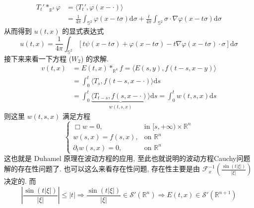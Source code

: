 \documentclass[11pt]{ctexart}[UTF8]
\begin{document}
\begin{equation*}
    \begin{aligned}
        T_{t}' \ast_{\mathbb{R}^{3}} \varphi &= \langle T_{t}', \varphi(x - \cdot) \rangle \\
                                         &= \frac{1}{4\pi}\int_{\mathbb{S}^{2}}  \varphi(x - t\sigma) \mathrm{d}\sigma + \frac{t}{4\pi}\int_{\mathbb{S}^{2}}  \sigma \cdot \nabla\varphi(x - t\sigma) \mathrm{d}\sigma
    \end{aligned}
\end{equation*}
从而得到 $u(t,x)$ 的显式表达式
\begin{equation}\label{Explict Kirchhoff formula}
    u(t,x) = \frac{1}{4\pi}\int_{\mathbb{S}^{2}} \left[ t\psi(x-t\sigma)+\varphi(x-t\sigma)-t \nabla\varphi(x-t\sigma)\cdot \sigma \right]\mathrm{d}\sigma
\end{equation}
接下来来看一下方程 ($W_{2}$) 的求解. 
\begin{equation*}
    \begin{aligned}
        v(t,x) &= E(t,x) \ast_{\mathbb{R}^{4}} f = \langle E(s,y), f(t-s,x-y) \rangle \\
               &= \int_{0}^{t} \langle T_{s}, f(t-s,x-\cdot) \rangle \mathrm{d}s\\
               &= \int_{0}^{t} \underbrace{\langle T_{t-s}, f(s,x-\cdot) \rangle}_{w(t,s,x)} \mathrm{d}s = \int_{0}^{t} w(t,s,x) \mathrm{d}s
    \end{aligned}
\end{equation*}
则这里 $w(t,s,x)$ 满足方程
\begin{equation*}
    \begin{cases}
        \Box w = 0, & \text{in } [s,+\infty)\times\mathbb{R}^n\\
        w(s,x) = f(s,x), & \text{on }  \mathbb{R}^n\\
        \partial_{t} w(s,x) = 0, & \text{on }  \mathbb{R}^n
    \end{cases}
\end{equation*}
这也就是 Duhamel 原理在波动方程的应用, 至此也就说明的波动方程Cauchy问题解的存在性问题了. 也可以这么来看存在性问题, 存在性主要是由 $\mathcal{F}_{x}^{-1}\left( \frac{\sin(t|\xi|)}{|\xi|} \right)$
决定的. 而
\begin{equation*}
    \left| \frac{\sin(t|\xi|)}{|\xi|} \right| \leq |t| \Longrightarrow \frac{\sin(t|\xi|)}{|\xi|} \in \mathscr{S}'(\mathbb{R}^{n}) \Longrightarrow E(t,x) \in \mathscr{S}'(\mathbb{R}^{n+1})
\end{equation*}
\end{document}
